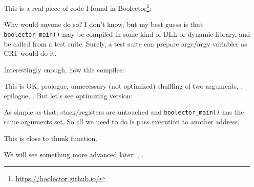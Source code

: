 \label{Boolector}

This is a real piece of code I found in Boolector\footnote{\url{https://boolector.github.io/}}:



Why would anyone do so?
I don't know, but my best guess is that \verb|boolector_main()| may be compiled in some kind of DLL or dynamic library,
and be called from a test suite.
Surely, a test suite can prepare argc/argv variables as \ac{CRT} would do it.

Interestingly enough, how this compiles:



This is OK, prologue, unnecessary (not optimized) shuffling of two arguments, , epilogue, .
But let's see optimizing version:



As simple as that: stack/registers are untouched and \verb|boolector_main()| has the same arguments set.
So all we need to do is pass execution to another address.

This is close to \gls{thunk function}.

We will see something more advanced later: , .

